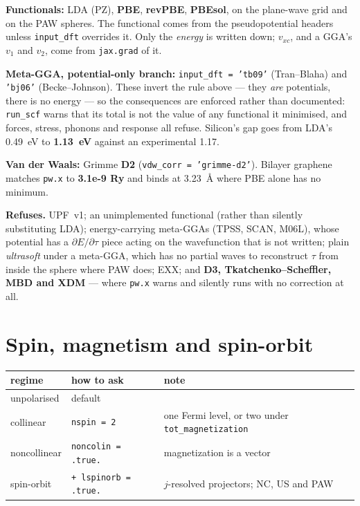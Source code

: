 \documentclass[11pt,a4paper]{article}
\newcommand{\code}[1]{\texttt{\small #1}}
\begin{document}
\textbf{Functionals:} LDA (PZ), \textbf{PBE}, \textbf{revPBE}, \textbf{PBEsol},
on the plane-wave grid and on the PAW spheres. The functional comes from the
pseudopotential headers unless \code{input\_dft} overrides it. Only the
\emph{energy} is written down; $v_{xc}$, and a GGA's $v_1$ and $v_2$, come from
\code{jax.grad} of it.

\textbf{Meta-GGA, potential-only branch:} \code{input\_dft = 'tb09'}
(Tran--Blaha) and \code{'bj06'} (Becke--Johnson). These invert the rule above
--- they \emph{are} potentials, there is no energy --- so the consequences are
enforced rather than documented: \code{run\_scf} warns that its total is not the
value of any functional it minimised, and forces, stress, phonons and response
all refuse. Silicon's gap goes from LDA's 0.49~eV to \textbf{1.13~eV} against an
experimental 1.17.

\textbf{Van der Waals:} Grimme \textbf{D2} (\code{vdw\_corr = 'grimme-d2'}).
Bilayer graphene matches \code{pw.x} to \textbf{3.1e-9 Ry} and binds at
3.23~\AA{} where PBE alone has no minimum.

\begin{refuses}
\textbf{Refuses.} UPF~v1; an unimplemented functional (rather than silently
substituting LDA); energy-carrying meta-GGAs (TPSS, SCAN, M06L), whose potential
has a $\partial E/\partial\tau$ piece acting on the wavefunction that is not
written; plain \emph{ultrasoft} under a meta-GGA, which has no partial waves to
reconstruct $\tau$ from inside the sphere where PAW does; EXX; and
\textbf{D3, Tkatchenko--Scheffler, MBD and XDM} --- where \code{pw.x} warns and
silently runs with no correction at all.
\end{refuses}

\section{Spin, magnetism and spin-orbit}

\begin{center}
\small
\begin{tabular}{@{}lll@{}}
\toprule
\textbf{regime} & \textbf{how to ask} & \textbf{note} \\
\midrule
unpolarised & default & \\
collinear & \code{nspin = 2} & one Fermi level, or two under \code{tot\_magnetization} \\
noncollinear & \code{noncolin = .true.} & magnetization is a vector \\
spin-orbit & \code{+ lspinorb = .true.} & $j$-resolved projectors; NC, US and PAW \\
\bottomrule
\end{tabular}
\end{center}
\end{document}
